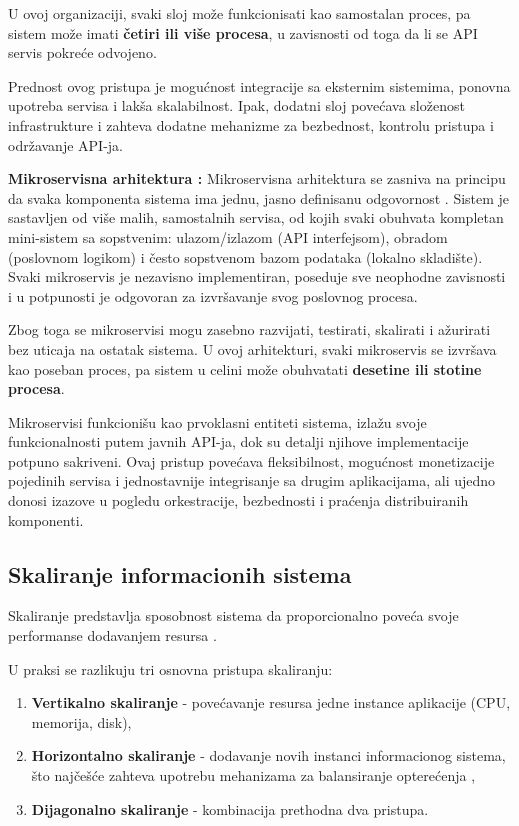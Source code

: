 \begin{description}
U ovoj organizaciji, svaki sloj može funkcionisati kao samostalan proces, pa sistem može imati \textbf{četiri ili više procesa}, u zavisnosti od toga da li se API servis pokreće odvojeno.

Prednost ovog pristupa je mogućnost integracije sa eksternim sistemima, ponovna upotreba servisa i lakša skalabilnost. Ipak, dodatni sloj povećava složenost infrastrukture i zahteva dodatne mehanizme za bezbednost, kontrolu pristupa i održavanje API-ja.

\item \textbf{Mikroservisna arhitektura \cite{alshuqayran2016systematic}:}
Mikroservisna arhitektura se zasniva na principu da svaka komponenta sistema ima jednu, jasno definisanu odgovornost . Sistem je sastavljen od više malih, samostalnih servisa, od kojih svaki obuhvata kompletan mini-sistem sa sopstvenim: ulazom/izlazom (API interfejsom), obradom (poslovnom logikom) i često sopstvenom bazom podataka (lokalno skladište). Svaki mikroservis je nezavisno implementiran, poseduje sve neophodne zavisnosti i u potpunosti je odgovoran za izvršavanje svog poslovnog procesa.

Zbog toga se mikroservisi mogu zasebno razvijati, testirati, skalirati i ažurirati bez uticaja na ostatak sistema. U ovoj arhitekturi, svaki mikroservis se izvršava kao poseban proces, pa sistem u celini može obuhvatati \textbf{desetine ili stotine procesa}.

Mikroservisi funkcionišu kao prvoklasni entiteti sistema, izlažu svoje funkcionalnosti putem javnih API-ja, dok su detalji njihove implementacije potpuno sakriveni. Ovaj pristup povećava fleksibilnost, mogućnost monetizacije pojedinih servisa i jednostavnije integrisanje sa drugim aplikacijama, ali ujedno donosi izazove u pogledu orkestracije, bezbednosti i praćenja distribuiranih komponenti.
\end{description}

\subsection{Skaliranje informacionih sistema}
\begin{definicija}
Skaliranje predstavlja sposobnost sistema da proporcionalno poveća svoje performanse dodavanjem resursa \cite{bondi2000characteristics}.
\end{definicija}

U praksi se razlikuju tri osnovna pristupa skaliranju:

\begin{enumerate}
\item \textbf{Vertikalno skaliranje } - povećavanje resursa jedne instance aplikacije (CPU, memorija, disk),
\item \textbf{Horizontalno skaliranje } - dodavanje novih instanci informacionog sistema, što najčešće zahteva upotrebu mehanizama za balansiranje opterećenja ,
\item \textbf{Dijagonalno skaliranje} - kombinacija prethodna dva pristupa.
\end{enumerate}

